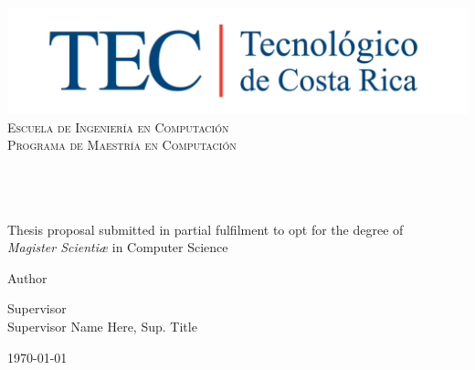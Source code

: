 \begin{titlepage}

\begin{center}

\vfill


\includegraphics[width=1\textwidth]{../images/TECRGB.jpg}
\\[0.2cm]
\textcolor{tecblue}{
\textsc{\LARGE Escuela de Ingeniería en Computación}\\[0.2cm]
\textsc{\large Programa de Maestría en Computación}\\
}
\vfill
 
\HRule
\\[0.9cm]
\doublespacing
{ \huge \bfseries \thesistitle}
\\[0.4cm]
\singlespacing
\HRule
\\[0.9cm]

{\large Thesis proposal submitted in partial fulfilment to opt for the degree of 
\\[1cm]
\textit{Magister Scientiæ} in Computer Science}
\\
\vfill
 
\begin{minipage}{0.45\textwidth}
\begin{flushleft} \large
Author\\
\pdfauthor 
\end{flushleft}
\end{minipage}
\begin{minipage}{0.50\textwidth}
\begin{flushright} \large
Supervisor\\
{Supervisor Name Here, Sup. Title}
\end{flushright}
\end{minipage}
 
 
\vfill
 
{\large \today \\}  \hfill{} 


\end{center}
\end{titlepage}


